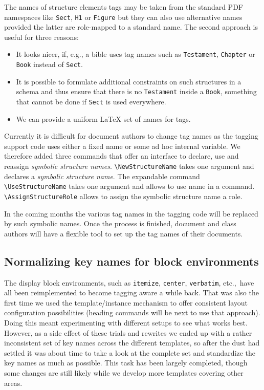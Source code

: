 \documentclass{ltnews}
\begin{document}
 The names of structure elements tags may be taken from the standard
 PDF namespaces like \verb|Sect|, \verb|H1| or \verb|Figure| but they
 can also use alternative names provided the latter are role-mapped to
 a standard name. The second approach is useful for three reasons:
  \begin{itemize}
  \item It looks nicer, if, e.g., a bible uses tag names such as
    \texttt{Testament}, \texttt{Chapter} or \texttt{Book} instead of
    \texttt{Sect}.
  \item It is possible to formulate additional constraints on such
    structures in a schema and thus ensure that there is no
    \texttt{Testament} inside a \texttt{Book}, something that cannot
    be done if \texttt{Sect} is used everywhere.
  \item We can provide a uniform \LaTeX{} set of names for tags.
  \end{itemize}
  
  Currently it is difficult for document authors to change tag names
  as the tagging support code uses either a fixed name or some ad hoc
  internal variable. We therefore added three commands that offer an
  interface to declare, use and reassign \emph{symbolic structure
  names}. \verb+\NewStructureName+ takes one argument and declares a
  \emph{symbolic structure name}. The expandable command
  \verb+\UseStructureName+ takes one argument and allows to use name
  in a  command. \verb+\AssignStructureRole+ allows
  to assign the symbolic structure name a role.

  In the coming months the various tag names in the tagging code will
  be replaced by such symbolic names. Once the process is finished,
  document and class authors will have a flexible tool to set up the
  tag names of their documents.


\subsection{Normalizing key names for block environments}

The display block environments, such as \texttt{itemize},
\texttt{center}, \texttt{verbatim}, etc.,\ have all been reimplemented
to become tagging aware a while back. That was also the first time we
used the template/instance mechanism to offer consistent layout
configuration possibilities (heading commands will be next to use that
approach). Doing this meant experimenting with different setups to see
what works best. However, as a side effect of these trials and
rewrites we ended up with a rather inconsistent set of key names
across the different templates, so after the dust had settled it was
about time to take a look at the complete set and standardize the key
names as much as possible.  This task has been largely
completed, though some changes are still likely while we
develop more templates covering other areas.
\end{document}
